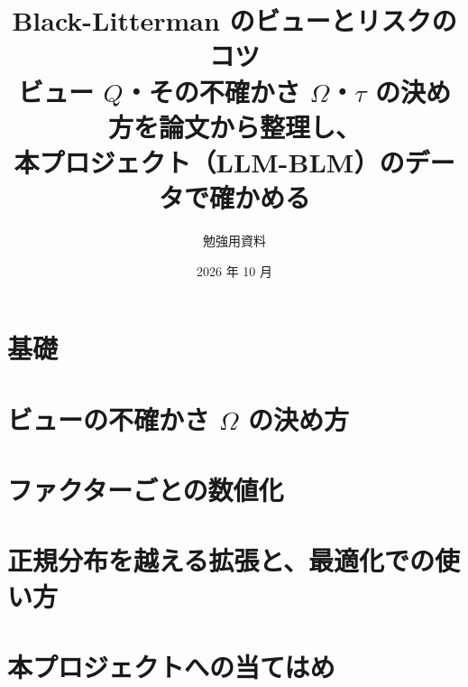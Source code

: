 \documentclass[xelatex,ja=standard,jafont=haranoaji,a4paper,11pt,openany]{bxjsreport}
\title{Black-Litterman のビューとリスクのコツ\\[6pt]
  \large ビュー $Q$・その不確かさ $\Omega$・$\tau$ の決め方を論文から整理し、\\
  本プロジェクト（LLM-BLM）のデータで確かめる}
\author{勉強用資料}
\date{2026 年 10 月}
\begin{document}
\maketitle
\setcounter{tocdepth}{1}
{\small\tableofcontents}



\part{基礎}





\part{ビューの不確かさ $\Omega$ の決め方}







\part{ファクターごとの数値化}






\part{正規分布を越える拡張と、最適化での使い方}





\part{本プロジェクトへの当てはめ}





\appendix








\end{document}
